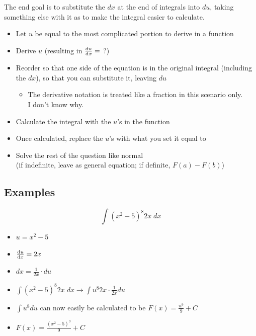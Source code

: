 \documentclass[a4paper,12pt]{article}
\begin{document}
The end goal is to substitute the $dx$ at the end of integrals into $du$, taking something else with it as to make the integral easier to calculate.
\begin{itemize}
    \item{Let $u$ be equal to the most complicated portion to derive in a function}
    \item{Derive $u$ (resulting in $\dv{u}{x} = $ ?)}
    \item{
        Reorder so that one side of the equation is in the original integral (including the $dx$), so that you can substitute it, leaving $du$
        \begin{itemize}
            \item{The derivative notation is treated like a fraction in this scenario only. \\I don't know why.}
        \end{itemize}
    }
    \item{Calculate the integral with the $u$'s in the function}
    \item{Once calculated, replace the $u$'s with what you set it equal to}
    \item{Solve the rest of the question like normal \\(if indefinite, leave as general equation; if definite, $F(a) - F(b)$)}
\end{itemize}

\subsection{Examples}
$$\int{(x^2 - 5)^8 2x}\;dx$$
\begin{itemize}
    \item{$u = x^2 - 5$}
    \item{$\dv{u}{x} = 2x$}
    \item{$dx = \frac{1}{2x} \cdot du$}
    \item{$\int{(x^2-5)^8 2x}\;dx \longrightarrow \int{u^8 2x \cdot \frac{1}{2x}}du$}
    \item{$\int{u^8}du$ can now easily be calculated to be $F(x) = \frac{u^9}{9} + C$}
    \item{$F(x) = \frac{(x^2-5)^9}{9} + C$}
\end{itemize}
\end{document}
